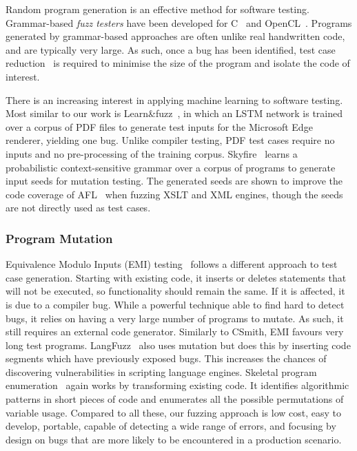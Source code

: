 Random program generation is an effective method for software testing. Grammar-based \emph{fuzz testers} have been developed for C~\cite{Yang2012} and OpenCL~\cite{Lidbury2015a}. Programs generated by grammar-based approaches are often  unlike real handwritten code, and are typically very large. As such, once a bug has been identified, test case reduction~\cite{Regehr2012a} is required to minimise the size of the program and isolate the code of interest.



There is an increasing interest in applying machine learning to software
testing. Most similar to our work is Learn\&fuzz~\cite{Godefroid2017}, in which
an LSTM network is trained over a corpus of PDF files to generate test inputs
for the Microsoft Edge renderer, yielding one bug. Unlike compiler testing, PDF
test cases require no inputs and no pre-processing of the training corpus.
Skyfire~\cite{Wang2017c} learns a probabilistic context-sensitive grammar over a
corpus of programs to generate input seeds for mutation testing. The generated
seeds are shown to improve the code coverage of AFL~\cite{Zalewski} when fuzzing
XSLT and XML engines, though the seeds are not directly used as test cases.


\subsubsection{Program Mutation}

Equivalence Modulo Inputs (EMI) testing~\cite{Le2013a,Sun2016a} follows a different approach to test case generation. Starting with existing code, it inserts or deletes statements that will not be executed, so functionality should remain the same. If it is affected, it is due to a compiler bug. While a powerful technique able to find hard to detect bugs, it relies on having a very large number of programs to mutate. As such, it still requires an external code generator. Similarly to CSmith, EMI favours very long test programs. LangFuzz~\cite{Holler2012} also uses mutation but does this by inserting code segments which have previously exposed bugs. This increases the chances of discovering vulnerabilities in scripting language engines. Skeletal program enumeration~\cite{Zhang2017a} again works by transforming existing code. It identifies algorithmic patterns in short pieces of code and enumerates all the possible permutations of variable usage. Compared to all these, our fuzzing approach is low cost, easy to develop, portable, capable of detecting a wide range of errors, and focusing by design on bugs that are more likely to be encountered in a production scenario.

